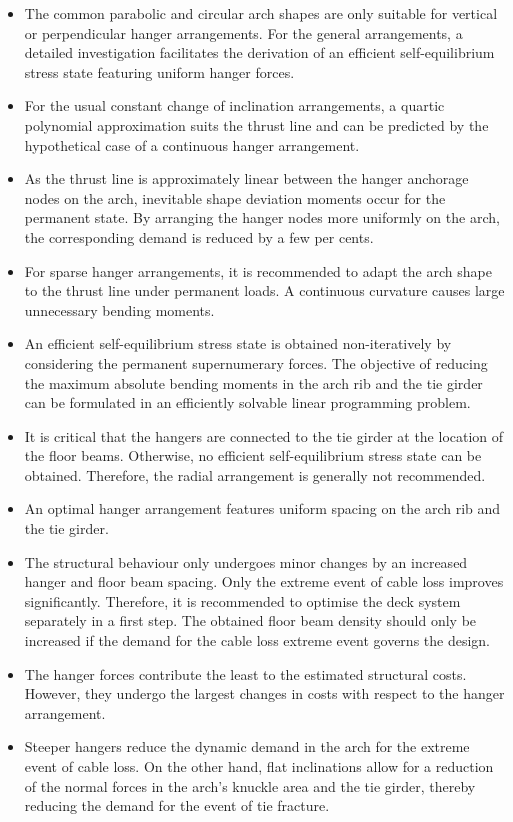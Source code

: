 \begin{itemize}
    \item The common parabolic and circular arch shapes are only suitable for vertical or perpendicular hanger arrangements. For the general arrangements, a detailed investigation facilitates the derivation of an efficient self-equilibrium stress state featuring uniform hanger forces.
    \item For the usual constant change of inclination arrangements, a quartic polynomial approximation suits the thrust line and can be predicted by the hypothetical case of a continuous hanger arrangement.
    \item As the thrust line is approximately linear between the hanger anchorage nodes on the arch, inevitable shape deviation moments occur for the permanent state. By arranging the hanger nodes more uniformly on the arch, the corresponding demand is reduced by a few per cents.
    \item For sparse hanger arrangements, it is recommended to adapt the arch shape to the thrust line under permanent loads. A continuous curvature causes large unnecessary bending moments.
    \item An efficient self-equilibrium stress state is obtained non-iteratively by considering the permanent supernumerary forces. The objective of reducing the maximum absolute bending moments in the arch rib and the tie girder can be formulated in an efficiently solvable linear programming problem.
    \item It is critical that the hangers are connected to the tie girder at the location of the floor beams. Otherwise, no efficient self-equilibrium stress state can be obtained.    Therefore, the radial arrangement is generally not recommended.
    \item An optimal hanger arrangement features uniform spacing on the arch rib and the tie girder.
    \item The structural behaviour only undergoes minor changes by an increased hanger and floor beam spacing. Only the extreme event of cable loss improves significantly. Therefore, it is recommended to optimise the deck system separately in a first step. The obtained floor beam density should only be increased if the demand for the cable loss extreme event governs the design.
    \item The hanger forces contribute the least to the estimated structural costs. However, they undergo the largest changes in costs with respect to the hanger arrangement.
    \item Steeper hangers reduce the dynamic demand in the arch for the extreme event of cable loss. On the other hand, flat inclinations allow for a reduction of the normal forces in the arch's knuckle area and the tie girder, thereby reducing the demand for the event of tie fracture.

\end{itemize}
